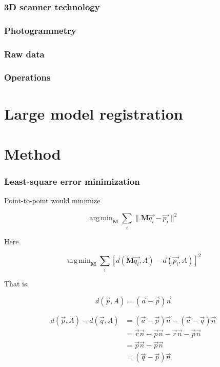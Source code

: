 \documentclass[a4paper,10pt]{scrreprt}
\DeclareMathOperator*{\argmin}{arg\,min}
\newcommand{\matr}[1]{\mathbf{#1}}
\begin{document}
\subsection{3D scanner technology}



\subsection{Photogrammetry}

\subsection{Raw data}

\subsection{Operations}


\chapter{Large model registration}


\chapter{Method}

\subsection{Least-square error minimization}
Point-to-point would minimize

\begin{equation}
	\argmin_{\matr{M}} \sum_{i} \| \matr{M} \vec{q_i} - \vec{p_i} \|^2
\end{equation}

Here

\begin{equation}
	\argmin_{\matr{M}} \sum_{i} \left[ d(\matr{M} \vec{q_i}, A) - d(\vec{p_i}, A) \right]^2
\end{equation}

That is

\begin{equation}
	d(\vec{p}, A) = (\vec{a} - \vec{p}) \vec{n} 
\end{equation}


\begin{equation}
\begin{aligned}
	d(\vec{p}, A) - d(\vec{q}, A) & = (\vec{a} - \vec{p}) \vec{n} - (\vec{a} - \vec{q}) \vec{n}  \\
	& = \vec{r} \vec{n} - \vec{p} \vec{n} - \vec{r} \vec{n} - \vec{p} \vec{n} \\
	& = \vec{p} \vec{n} - \vec{p} \vec{n} \\
	& = (\vec{q} - \vec{p}) \vec{n}
\end{aligned}
\end{equation}
\end{document}
